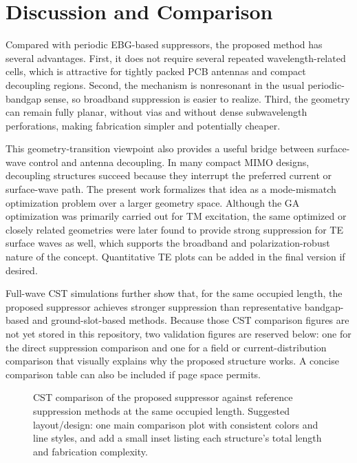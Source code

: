 \documentclass[journal]{IEEEtran}
\begin{document}
\section{Discussion and Comparison}
Compared with periodic EBG-based suppressors, the proposed method has several advantages. First, it does not require several repeated wavelength-related cells, which is attractive for tightly packed PCB antennas and compact decoupling regions. Second, the mechanism is nonresonant in the usual periodic-bandgap sense, so broadband suppression is easier to realize. Third, the geometry can remain fully planar, without vias and without dense subwavelength perforations, making fabrication simpler and potentially cheaper.

This geometry-transition viewpoint also provides a useful bridge between surface-wave control and antenna decoupling. In many compact MIMO designs, decoupling structures succeed because they interrupt the preferred current or surface-wave path. The present work formalizes that idea as a mode-mismatch optimization problem over a larger geometry space. Although the GA optimization was primarily carried out for TM excitation, the same optimized or closely related geometries were later found to provide strong suppression for TE surface waves as well, which supports the broadband and polarization-robust nature of the concept. Quantitative TE plots can be added in the final version if desired.

Full-wave CST simulations further show that, for the same occupied length, the proposed suppressor achieves stronger suppression than representative bandgap-based and ground-slot-based methods. Because those CST comparison figures are not yet stored in this repository, two validation figures are reserved below: one for the direct suppression comparison and one for a field or current-distribution comparison that visually explains why the proposed structure works. A concise comparison table can also be included if page space permits.

\begin{figure}[t]
\centering
{}
\caption{CST comparison of the proposed suppressor against reference suppression methods at the same occupied length. Suggested layout/design: one main comparison plot with consistent colors and line styles, and add a small inset listing each structure's total length and fabrication complexity.}
\label{fig:cst_compare}
\end{figure}
\end{document}
